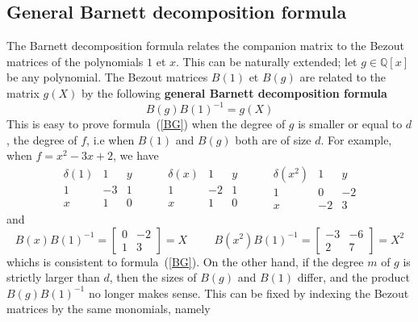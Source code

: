 \documentclass{standalone}
\begin{document}
\subsection{General Barnett decomposition formula}
\label{Bar_gen}
The Barnett decomposition formula relates the companion matrix to the Bezout matrices of the polynomials $1$ et $x$.
This can be naturally extended; let $g \in \mathbb{Q}[x]$ be any polynomial.
The Bezout matrices $B(1)$ et $B(g)$ are related to the matrix $g(X)$ by the following {\bf general Barnett decomposition formula}
\begin{equation}
	\label{BG}
	B(g)B(1)^{-1} = g(X)
\end{equation}
This is easy to prove formula~(\ref{BG}) when the degree of $g$ is smaller or equal to $d$, the degree of $f$, i.e when $B(1)$ and $B(g)$ both are of size $d$. For example, when $f = x^2 - 3x + 2$, we have
$$
\begin{array}{c|cc}
	\delta(1) & 1 & y \\
	\hline
	1 & -3 & 1 \\
	x & 1 & 0
\end{array}
\hspace{1cm}
\begin{array}{c|cc}
	\delta(x) & 1 & y \\
	\hline
	1 & -2 & 1 \\
	x & 1 & 0
\end{array}
\hspace{1cm}
\begin{array}{c|cc}
	\delta(x^2) & 1 & y \\
	\hline
	1 & 0 & -2 \\
	x & -2 & 3
\end{array}
$$
and
\begin{equation}
	B(x)B(1)^{-1} =
	\begin{bmatrix}
		0 & -2 \\
		1 & 3
	\end{bmatrix}
	= X
	\hspace{1cm}
	B(x^2)B(1)^{-1} =
	\begin{bmatrix}
		-3 & -6 \\
		2 & 7
	\end{bmatrix}
	= X^2
\end{equation}
whichs is consistent to formula~(\ref{BG}).
On the other hand, if the degree $m$ of $g$ is strictly larger than $d$, then the sizes of $B(g)$ and $B(1)$ differ, and the product $B(g)B(1)^{-1}$ no longer makes sense. This can be fixed by indexing the Bezout matrices by the same monomials, namely
\end{document}
